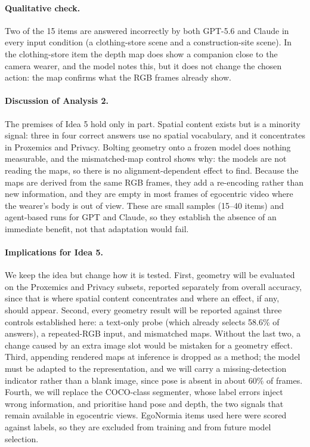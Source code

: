 \paragraph{Qualitative check.} Two of the 15 items are answered incorrectly by both GPT-5.6 and Claude in every input condition (a clothing-store scene and a construction-site scene). In the clothing-store item the depth map does show a companion close to the camera wearer, and the model notes this, but it does not change the chosen action: the map confirms what the RGB frames already show.

\paragraph{Discussion of Analysis 2.} The premises of Idea 5 hold only in part. Spatial content exists but is a minority signal: three in four correct answers use no spatial vocabulary, and it concentrates in Proxemics and Privacy. Bolting geometry onto a frozen model does nothing measurable, and the mismatched-map control shows why: the models are not reading the maps, so there is no alignment-dependent effect to find. Because the maps are derived from the same RGB frames, they add a re-encoding rather than new information, and they are empty in most frames of egocentric video where the wearer's body is out of view. These are small samples (15--40 items) and agent-based runs for GPT and Claude, so they establish the absence of an immediate benefit, not that adaptation would fail.

\paragraph{Implications for Idea 5.} We keep the idea but change how it is tested. First, geometry will be evaluated on the Proxemics and Privacy subsets, reported separately from overall accuracy, since that is where spatial content concentrates and where an effect, if any, should appear. Second, every geometry result will be reported against three controls established here: a text-only probe (which already selects 58.6\% of answers), a repeated-RGB input, and mismatched maps. Without the last two, a change caused by an extra image slot would be mistaken for a geometry effect. Third, appending rendered maps at inference is dropped as a method; the model must be adapted to the representation, and we will carry a missing-detection indicator rather than a blank image, since pose is absent in about 60\% of frames. Fourth, we will replace the COCO-class segmenter, whose label errors inject wrong information, and prioritise hand pose and depth, the two signals that remain available in egocentric views. EgoNormia items used here were scored against labels, so they are excluded from training and from future model selection.


